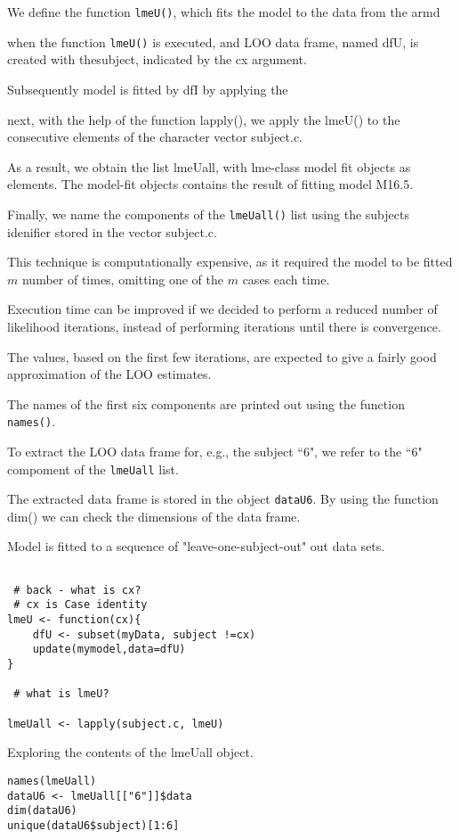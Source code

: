 \documentclass[a4paper,12pt]{article}
\begin{document}
We define the function \texttt{lmeU()}, which fits the model to the data from the armd

when the function \texttt{lmeU()} is executed, and LOO data frame, named dfU, is created with thesubject, indicated by the cx argument.

Subsequently model is fitted by dfI by applying the 


next, with the help of the function lapply(), we apply the lmeU() to the consecutive elements of the character vector subject.c.

As a result, we obtain the list lmeUall, with lme-class model fit objects as elements. The model-fit objects contains the result of fitting model
M16.5.

Finally, we name the components of the \texttt{lmeUall()} list using the subjects idenifier stored in the vector subject.c.

This technique is computationally expensive, as it required the model to be fitted $m$ number of times, omitting one of the $m$ cases each time.

Execution time can be improved if we decided to perform a reduced number of likelihood iterations, instead of performing iterations until there is convergence.

The values, based on the first few iterations, are expected to give a fairly good approximation of the LOO estimates.


The names of the first six components are printed out using the function \texttt{names()}.

To extract the LOO data frame for, e.g., the subject ``6", we refer to the ``6" compoment of the
\texttt{lmeUall} list.

The extracted data frame is stored in the object \texttt{dataU6}. By using the function dim() we can check the dimensions of the data frame.



Model is fitted to a sequence of "leave-one-subject-out" out data sets.


\begin{framed}
\begin{verbatim}

 # back - what is cx?
 # cx is Case identity
lmeU <- function(cx){
	dfU <- subset(myData, subject !=cx)
	update(mymodel,data=dfU)
}

 # what is lmeU?

lmeUall <- lapply(subject.c, lmeU)
\end{verbatim}
\end{framed}
Exploring the contents of the lmeUall object.
\begin{framed}
\begin{verbatim}
names(lmeUall)
dataU6 <- lmeUall[["6"]]$data
dim(dataU6)
unique(dataU6$subject)[1:6]
\end{verbatim}
\end{framed}
\end{document}
